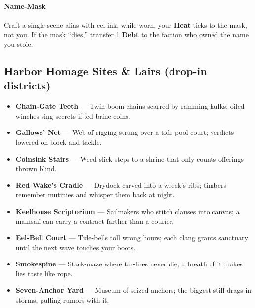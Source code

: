 \paragraph{Name-Mask}
Craft a single-scene alias with eel-ink; while worn, your \textbf{Heat} ticks to the mask, not you. If the mask “dies,” transfer 1 \textbf{Debt} to the faction who owned the name you stole.
\subsection*{Harbor Homage Sites \& Lairs (drop-in districts)}
\begin{itemize}
  \item \textbf{Chain-Gate Teeth} — Twin boom-chains scarred by ramming hulks; oiled winches sing secrets if fed brine coins.
  \item \textbf{Gallows’ Net} — Web of rigging strung over a tide-pool court; verdicts lowered on block-and-tackle.
  \item \textbf{Coinsink Stairs} — Weed-slick steps to a shrine that only counts offerings thrown blind.
  \item \textbf{Red Wake’s Cradle} — Drydock carved into a wreck’s ribs; timbers remember mutinies and whisper them back at night.
  \item \textbf{Keelhouse Scriptorium} — Sailmakers who stitch clauses into canvas; a mainsail can carry a contract farther than a courier.
  \item \textbf{Eel-Bell Court} — Tide-bells toll wrong hours; each clang grants sanctuary until the next wave touches your boots.
  \item \textbf{Smokespine} — Stack-maze where tar-fires never die; a breath of it makes lies taste like rope.
  \item \textbf{Seven-Anchor Yard} — Museum of seized anchors; the biggest still drags in storms, pulling rumors with it.
\end{itemize}

